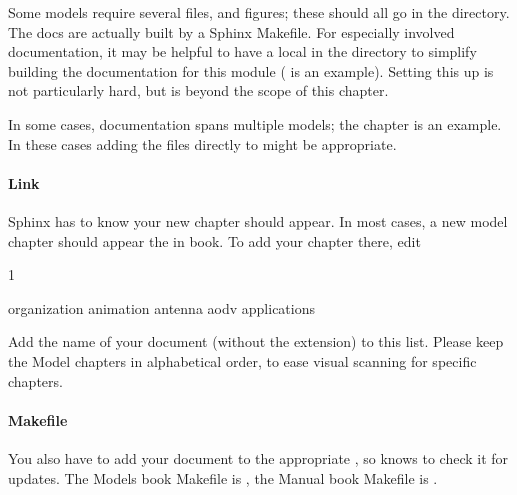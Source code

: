 \documentclass[letterpaper,10pt,english]{sphinxmanual}
\renewcommand{\sphinxcode}[1]{\texttt{\small{#1}}}
\begin{document}
Some models require several \sphinxcode{} files, and figures; these should
all go in the \sphinxcode{} directory.  The docs are actually built
by a Sphinx Makefile.  For especially involved
documentation, it may be helpful to have a local \sphinxcode{}
in the \sphinxcode{} directory to
simplify building the documentation for this module
( is an example).  Setting this up
is not particularly hard, but is beyond the scope of this chapter.

In some cases, documentation spans multiple models; the
 chapter is an example.  In these cases
adding the \sphinxcode{} files directly to \sphinxcode{} might
be appropriate.


\paragraph{Link}
\label{\detokenize{documentation:link}}
Sphinx has to know  your new chapter should appear.  In most
cases, a new model chapter should appear the in  book.
To add your chapter there, edit \sphinxcode{}

\begin{sphinxVerbatim}[commandchars=\\\{\}]
 
    1

  organization
  animation
  antenna
  aodv
  applications
\end{sphinxVerbatim}

Add the name of your document (without the \sphinxcode{} extension) to
this list.  Please keep the Model chapters in alphabetical order,
to ease visual scanning for specific chapters.


\paragraph{Makefile}
\label{\detokenize{documentation:makefile}}
You also have to add your document to the appropriate \sphinxcode{},
so \sphinxcode{} knows to check it for updates.  The Models book Makefile
is \sphinxcode{}, the Manual book Makefile is
\sphinxcode{}.
\end{document}

